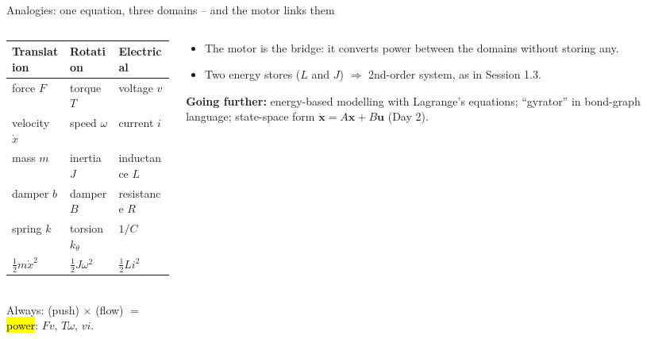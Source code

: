 \documentclass[aspectratio=169,10pt]{beamer}
\newcommand{\gofurther}[1]{{\scriptsize\color{mkGray}\textbf{Going further:} #1\par}}
\begin{document}
\begin{frame}{Analogies: one equation, three domains -- and the motor links them}
\begin{columns}[T]
\begin{column}{.5\textwidth}
\small
\renewcommand{\arraystretch}{1.15}
\begin{tabular}{@{}lll@{}}
\toprule
\textbf{Translation} & \textbf{Rotation} & \textbf{Electrical}\\
\midrule
force $F$ & torque $T$ & voltage $v$\\
velocity $\dot x$ & speed $\omega$ & current $i$\\
mass $m$ & inertia $J$ & inductance $L$\\
damper $b$ & damper $B$ & resistance $R$\\
spring $k$ & torsion $k_\theta$ & $1/C$\\
$\tfrac12 m\dot x^2$ & $\tfrac12 J\omega^2$ & $\tfrac12 L i^2$\\
\bottomrule
\end{tabular}\\[2mm]
Always: (push) $\times$ (flow) $=$ \hl{power}: $Fv$, $T\omega$, $vi$.
\end{column}
\begin{column}{.48\textwidth}
\centering
{}

\vspace{2mm}
\small
\begin{itemize}\setlength\itemsep{2pt}
\item The motor is the bridge: it converts power between the domains without storing any.
\item Two energy stores ($L$ and $J$) $\Rightarrow$ 2nd-order system, as in Session 1.3.
\end{itemize}
\gofurther{energy-based modelling with Lagrange's equations; ``gyrator'' in bond-graph language; state-space form $\dot{\bm x}=A\bm x+B\bm u$ (Day 2).}
\end{column}
\end{columns}
\end{frame}
\end{document}
